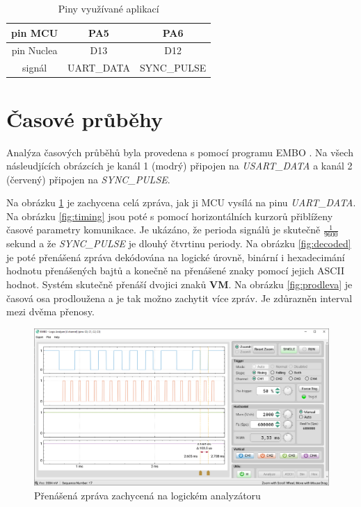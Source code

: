 \documentclass[twoside]{article}
\begin{document}
\begin{table}[htbp]
    \centering
    \begin{tabular}{c|c|c}
        pin MCU & PA5 & PA6 \\ \hline
        pin Nuclea & D13 & D12 \\ \hline
        signál & UART\_DATA & SYNC\_PULSE
    \end{tabular}
    \caption{Piny využívané aplikací}
    \label{table:pinout}
\end{table}

\section{Časové průběhy}

Analýza časových průběhů byla provedena s pomocí programu EMBO \cite{EMBO}. Na všech násleudjících obrázcích
je kanál 1 (modrý) připojen na \textit{USART\_DATA} a kanál 2 (červený) připojen na \textit{SYNC\_PULSE}.

Na obrázku \ref{fig:zprava} je zachycena celá zpráva, jak ji MCU vysílá na pinu \textit{UART\_DATA}.
Na obrázku \ref{fig:timing} jsou poté s pomocí horizontálních kurzorů přiblíženy časové parametry komunikace.
Je ukázáno, že perioda signálů je skutečně $\frac{1}{9600}$ sekund a že \textit{SYNC\_PULSE} je dlouhý čtvrtinu
periody.
Na obrázku \ref{fig:decoded} je poté přenášená zpráva dekódována na logické úrovně, binární i hexadecimání hodnotu přenášených bajtů
a konečně na přenášené znaky pomocí jejich ASCII hodnot. Systém skutečně přenáší dvojici znaků \textbf{VM}.
Na obrázku \ref{fig:prodleva} je časová osa prodloužena a je tak možno zachytit více zpráv. Je zdůrazněn interval mezi dvěma přenosy.

\begin{figure}[htbp]
    \includegraphics[width=\linewidth]{embo_zprava.png}
    \caption{Přenášená zpráva zachycená na logickém analyzátoru}
    \label{fig:zprava}
\end{figure}
\end{document}
